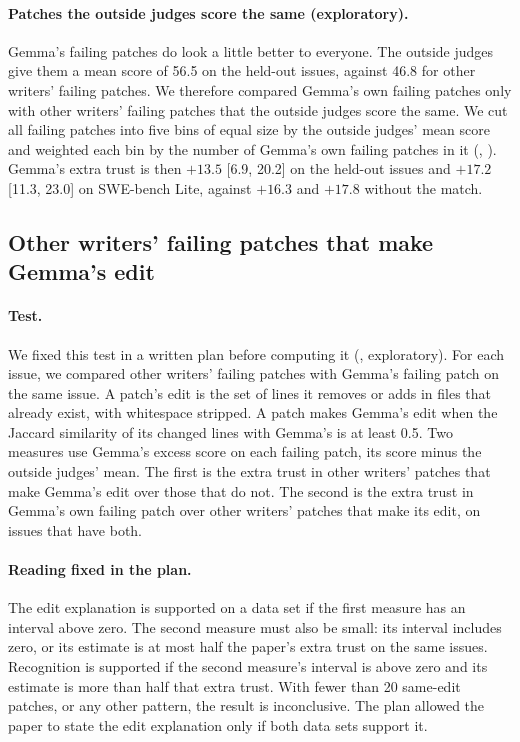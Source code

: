 \documentclass[10pt,letterpaper]{article}
\begin{document}
\paragraph{Patches the outside judges score the same (exploratory).} Gemma's failing patches do look a little better
to everyone. The outside judges give them a mean score of 56.5 on the held-out issues, against 46.8 for other writers'
failing patches. We therefore compared Gemma's own failing patches only with other writers' failing patches that the
outside judges score the same. We cut all failing patches into five bins of equal size by the outside judges' mean
score and weighted each bin by the number of Gemma's own failing patches in it
(, ). Gemma's extra
trust is then $+13.5$ [6.9, 20.2] on the held-out issues and $+17.2$ [11.3, 23.0] on SWE-bench Lite, against
$+16.3$ and $+17.8$ without the match.

\subsection*{Other writers' failing patches that make Gemma's edit}

\paragraph{Test.} We fixed this test in a written plan before computing it (,
exploratory). For each issue, we compared other writers' failing patches with Gemma's failing patch on the same issue.
A patch's edit is the set of lines it removes or adds in files that already exist, with whitespace stripped. A
patch makes Gemma's edit when the Jaccard similarity of its changed lines with Gemma's is at least 0.5. Two measures
use Gemma's excess score on each failing patch, its score minus the outside judges' mean. The first is the extra trust
in other writers' patches that make Gemma's edit over those that do not. The second is the extra trust in Gemma's own
failing patch over other writers' patches that make its edit, on issues that have both.

\paragraph{Reading fixed in the plan.} The edit explanation is supported on a data set if the first measure has an
interval above zero. The second measure must also be small: its interval includes zero, or its estimate is at most
half the paper's extra trust on the same issues. Recognition is supported if the second measure's interval is above zero and its estimate
is more than half that extra trust. With fewer than 20 same-edit patches, or any other pattern, the result is
inconclusive. The plan allowed the paper to state the edit explanation only if both data sets support it.
\end{document}
